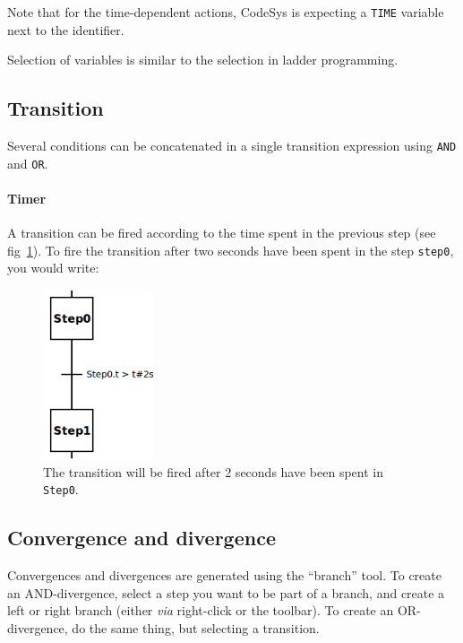 \documentclass[10pt,a4paper]{article}
\begin{document}
Note that for the time-dependent actions, CodeSys is expecting a \texttt{TIME} variable next to the identifier.

Selection of variables is similar to the selection in ladder programming.

\subsection{Transition}
Several conditions can be concatenated in a single transition expression using \texttt{AND} and \texttt{OR}.

\paragraph{Timer}
A transition can be fired according to the time spent in the previous step (see fig~\ref{fig:transition-timer}).
To fire the transition after two seconds have been spent in the step \texttt{step0}, you would write:

\begin{figure}
  \begin{center}
    \includegraphics[height=5cm]{transition-timer.png}
  \end{center}
  \caption{The transition will be fired after 2 seconds have been spent in \texttt{Step0}.}
  \label{fig:transition-timer}
\end{figure}

\subsection{Convergence and divergence}
Convergences and divergences are generated using the ``branch'' tool.
To create an AND-divergence, select a step you want to be part of a branch, and create a left or right branch (either \textit{via} right-click or the toolbar).
To create an OR-divergence, do the same thing, but selecting a transition.
\end{document}
